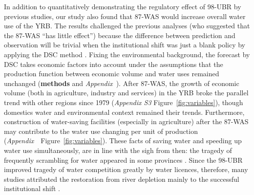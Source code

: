 
\label{discussion-1}
In addition to quantitatively demonstrating the regulatory effect of 98-UBR by previous studies, our study also found that 87-WAS would increase overall water use of the YRB.
The results challenged the previous analyses (who suggested that the 87-WAS ``has little effect'') because the difference between prediction and observation will be trivial when the institutional shift was just a blank policy by applying the DSC method \cite{abadie2015,hill2021}.
Fixing the environmental background, the forecast by DSC takes economic factors into account under the assumptions that the production function between economic volume and water uses remained unchanged (\textbf{methods} and \textit{Appendix~}).
After 87-WAS, the growth of economic volume (both in agriculture, industry and services) in the YRB broke the parallel trend with other regions since 1979 (\textit{Appendix S3} Figure~\ref{fig:variables}), though domestics water and environmental context remained their trends.
Furthermore, construction of water-saving facilities (especially in agriculture) after the 87-WAS may contribute to the water use changing per unit of production (\textit{Appendix~}~Figure~\ref{fig:variables}).
These facts of saving water and speeding up water use simultaneously, are in line with the sigh from then: the tragedy of frequently scrambling for water appeared in some provinces \cite{mao2000}.
Since the 98-UBR improved tragedy of water competition greatly by water licences, therefore, many studies attributed the restoration from river depletion mainly to the successful institutional shift \cite{chen2021,huangang2002,an2007}.

